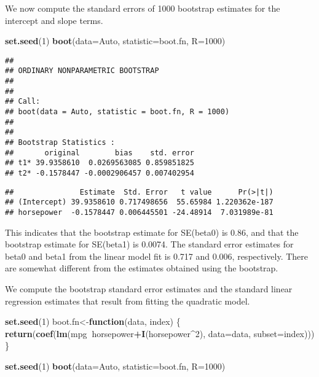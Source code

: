 \documentclass[]{article}
\newenvironment{Shaded}{\begin{snugshade}}{\end{snugshade}}
\newcommand{\KeywordTok}[1]{\textcolor[rgb]{0.13,0.29,0.53}{\textbf{#1}}}
\newcommand{\DataTypeTok}[1]{\textcolor[rgb]{0.13,0.29,0.53}{#1}}
\newcommand{\DecValTok}[1]{\textcolor[rgb]{0.00,0.00,0.81}{#1}}
\newcommand{\ControlFlowTok}[1]{\textcolor[rgb]{0.13,0.29,0.53}{\textbf{#1}}}
\newcommand{\OperatorTok}[1]{\textcolor[rgb]{0.81,0.36,0.00}{\textbf{#1}}}
\newcommand{\NormalTok}[1]{#1}
\begin{document}
We now compute the standard errors of 1000 bootstrap estimates for the
intercept and slope terms.

\begin{Shaded}
\begin{Highlighting}[]
\KeywordTok{set.seed}\NormalTok{(}\DecValTok{1}\NormalTok{)}
\KeywordTok{boot}\NormalTok{(}\DataTypeTok{data=}\NormalTok{Auto, }\DataTypeTok{statistic=}\NormalTok{boot.fn, }\DataTypeTok{R=}\DecValTok{1000}\NormalTok{)}
\end{Highlighting}
\end{Shaded}

\begin{verbatim}
## 
## ORDINARY NONPARAMETRIC BOOTSTRAP
## 
## 
## Call:
## boot(data = Auto, statistic = boot.fn, R = 1000)
## 
## 
## Bootstrap Statistics :
##       original        bias    std. error
## t1* 39.9358610  0.0269563085 0.859851825
## t2* -0.1578447 -0.0002906457 0.007402954
\end{verbatim}

\begin{Shaded}
\end{Shaded}

\begin{verbatim}
##               Estimate  Std. Error   t value      Pr(>|t|)
## (Intercept) 39.9358610 0.717498656  55.65984 1.220362e-187
## horsepower  -0.1578447 0.006445501 -24.48914  7.031989e-81
\end{verbatim}

This indicates that the bootstrap estimate for SE(beta0) is 0.86, and
that the bootstrap estimate for SE(beta1) is 0.0074. The standard error
estimates for beta0 and beta1 from the linear model fit is 0.717 and
0.006, respectively. There are somewhat different from the estimates
obtained using the bootstrap.

We compute the bootstrap standard error estimates and the standard
linear regression estimates that result from fitting the quadratic
model.

\begin{Shaded}
\begin{Highlighting}[]
\KeywordTok{set.seed}\NormalTok{(}\DecValTok{1}\NormalTok{)}
\NormalTok{boot.fn<-}\ControlFlowTok{function}\NormalTok{(data, index) \{}
    \KeywordTok{return}\NormalTok{(}\KeywordTok{coef}\NormalTok{(}\KeywordTok{lm}\NormalTok{(mpg}\OperatorTok{~}\NormalTok{horsepower}\OperatorTok{+}\KeywordTok{I}\NormalTok{(horsepower}\OperatorTok{^}\DecValTok{2}\NormalTok{), }\DataTypeTok{data=}\NormalTok{data, }\DataTypeTok{subset=}\NormalTok{index)))}
\NormalTok{\}}

\KeywordTok{set.seed}\NormalTok{(}\DecValTok{1}\NormalTok{)}
\KeywordTok{boot}\NormalTok{(}\DataTypeTok{data=}\NormalTok{Auto, }\DataTypeTok{statistic=}\NormalTok{boot.fn, }\DataTypeTok{R=}\DecValTok{1000}\NormalTok{)}
\end{Highlighting}
\end{Shaded}
\end{document}

